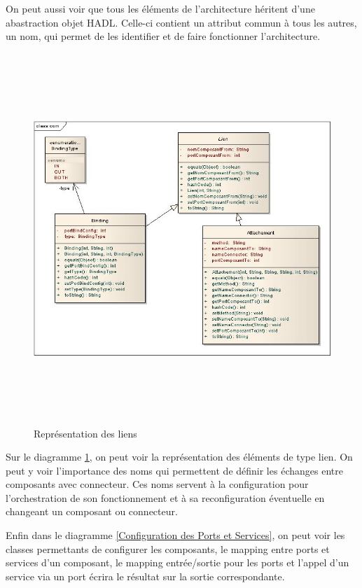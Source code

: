 \documentclass[11pt,a4paper]{article}
\begin{document}
On peut aussi voir que tous les éléments de l'architecture héritent d'une
abastraction objet HADL. Celle-ci contient un attribut commun à tous les
autres, un nom, qui permet de les identifier et de faire fonctionner
l'architecture.


\begin{figure}[h]
  		\centering
  		\includegraphics[height=14cm,width=15cm]{comimpl.jpg}
  		\caption{Représentation des liens}
  		\label{Représentation des liens}
\end{figure}

Sur le diagramme \ref{Représentation des liens}, on peut voir la représentation
des éléments de type lien. On peut y voir l'importance des noms qui permettent
de définir les échanges entre composants avec connecteur. Ces noms servent à la
configuration pour l'orchestration de son fonctionnement et à sa reconfiguration
éventuelle en changeant un composant ou connecteur.


Enfin dans le diagramme \ref{Configuration des Ports et Services}, on peut
voir les classes permettants de configurer les composants, le mapping entre
ports et services d'un composant, le mapping entrée/sortie pour les ports et
l'appel d'un service via un port écrira le résultat sur la sortie
correspondante.
\end{document}

